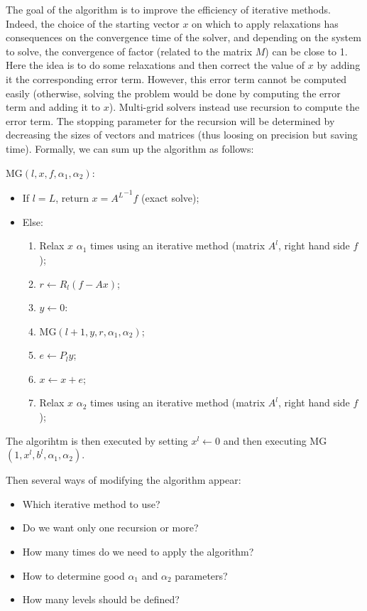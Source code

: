 \documentclass[a4paper,10pt]{article}
\begin{document}
  The goal of the algorithm is to improve the efficiency of iterative methods. Indeed, the choice of the starting vector $x$ on which to apply relaxations has consequences on the convergence
  time of the solver, and depending on the system to solve, the convergence of factor (related to the matrix $M$) can be close to 1.\\
  Here the idea is to do some relaxations and then correct the value of $x$ by adding it the corresponding error term. However, this error term cannot be computed easily (otherwise,
  solving the problem would be done by computing the error term and adding it to $x$). Multi-grid solvers instead use recursion to compute the error term. The stopping parameter for the
  recursion will be determined by decreasing the sizes of vectors and matrices (thus loosing on precision but saving time).
  Formally, we can sum up the algorithm as follows:
  
  MG$(l,x,f,\alpha_1,\alpha_2)$:
  \begin{itemize}
    \item If $l = L$, return $x = {A^L}^{-1} f$ (exact solve);
    \item Else:
    \begin{enumerate}
      \item Relax $x$ $\alpha_1$ times using an iterative method (matrix $A^l$, right hand side $f$);
      \item $r \leftarrow R_l ( f - Ax )$;
      \item $y \leftarrow 0$:
      \item MG$(l+1,y,r,\alpha_1,\alpha_2)$;
      \item $e \leftarrow P_{l} y$;
      \item $x \leftarrow x+e$;
      \item Relax $x$ $\alpha_2$ times using an iterative method (matrix $A^l$, right hand side $f$);
   \end{enumerate}
  \end{itemize}
  The algorihtm is then executed by setting $x^l \leftarrow 0$ and then executing MG$(1,x^l,b^l,\alpha_1,\alpha_2)$.

  Then several ways of modifying the algorithm appear:
  \begin{itemize}
   \item Which iterative method to use?
   \item Do we want only one recursion or more?
   \item How many times do we need to apply the algorithm?
   \item How to determine good $\alpha_1$ and $\alpha_2$ parameters?
   \item How many levels should be defined?
  \end{itemize}
\end{document}
